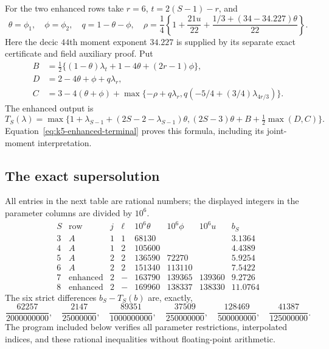 \documentclass[11pt,reqno]{amsart}
\numberwithin{equation}{section}
\theoremstyle{definition}
\begin{document}
For the two enhanced rows take $r=6$, $t=2(S-1)-r$, and
\[
 \theta=\phi_1,\quad\phi=\phi_2,\quad q=1-\theta-\phi,
 \quad
 \rho=\frac14\left\{1+\frac{21u}{22}
                  +\frac{1/3+(34-34.227)\theta}{22}\right\}.
\]
Here the decic $44$th moment exponent $34.227$ is supplied by its separate
exact certificate and field auxiliary proof.
Put
\begin{align*}
 B&=\tfrac12\{(1-\theta)\lambda_t+1-4\theta+(2r-1)\phi\},\\
 D&=2-4\theta+\phi+q\lambda_r,\\
 C&=3-4(\theta+\phi)
        +\max\{-\rho+q\lambda_r,
                 q(-5/4+(3/4)\lambda_{4r/3})\}.
\end{align*}
The enhanced output is
\[
 T_S(\lambda)=\max\{1+\lambda_{S-1}
             +(2S-2-\lambda_{S-1})\theta,
                         (2S-3)\theta+B+\tfrac12\max(D,C)\}.
\]
Equation~\eqref{eq:k5-enhanced-terminal} proves this formula, including its
joint-moment interpretation.

\subsection{The exact supersolution}
All entries in the next table are rational numbers; the displayed integers
in the parameter columns are divided by $10^6$.
\[
\begin{array}{c|c|c|c|r|r|r|c}
 S&\text{row}&j&\ell&10^6\theta&10^6\phi&10^6u&b_S\\\hline
3&A&1&1&68130&&&3.1364\\
4&A&1&2&105600&&&4.4389\\
5&A&2&2&136590&72270&&5.9254\\
6&A&2&2&151340&113110&&7.5422\\
7&\text{enhanced}&2&-&163790&139365&139360&9.2726\\
8&\text{enhanced}&2&-&169960&138337&138330&11.0764
\end{array}
\]
The six strict differences $b_S-T_S(b)$ are, exactly,
\[
 \frac{62257}{2000000000},\quad
 \frac{2147}{25000000},\quad
 \frac{89351}{1000000000},\quad
 \frac{37509}{250000000},\quad
 \frac{128469}{500000000},\quad
 \frac{41387}{125000000}.
\]
The program included below verifies all parameter restrictions, interpolated
indices, and these rational inequalities without floating-point arithmetic.
\end{document}
